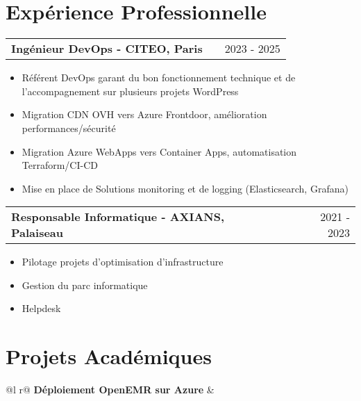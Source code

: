 \documentclass[a4paper,11pt]{article}
\makeatletter
\newenvironment{joblong}[2]
    {
    \begin{tabularx}{\linewidth}{@{}l X r@{}}
    \textbf{#1} & \hfill &  #2 \\[2pt]
    \end{tabularx}
    \begin{minipage}[t]{\linewidth}
    \begin{itemize}[nosep,after=\strut, leftmargin=1em, itemsep=1pt,label=--]
    }
    {
    \end{itemize}
    \end{minipage}    
    }
\makeatother
\begin{document}
\vspace{6pt}


\section{Expérience Professionnelle}

\begin{joblong}{Ingénieur DevOps - CITEO, Paris}{2023 - 2025}
\item Référent DevOps garant du bon fonctionnement technique et de l’accompagnement sur plusieurs projets WordPress
\item Migration CDN OVH vers Azure Frontdoor, amélioration performances/sécurité
\item Migration Azure WebApps vers Container Apps, automatisation Terraform/CI-CD
\item Mise en place de Solutions monitoring et de logging (Elasticsearch, Grafana)
\end{joblong}

\vspace{3pt}

\begin{joblong}{Responsable Informatique - AXIANS, Palaiseau}{2021 - 2023}
\item Pilotage projets d'optimisation d'infrastructure
\item Gestion du parc informatique
\item Helpdesk
\end{joblong}

\vspace{6pt}

  
\section{Projets Académiques}

\begin{tabularx}{\linewidth}{ @{}l r@{} }
\textbf{Déploiement OpenEMR sur Azure} & \hfill \\[1pt]
 \\
\end{tabularx}
\end{document}
